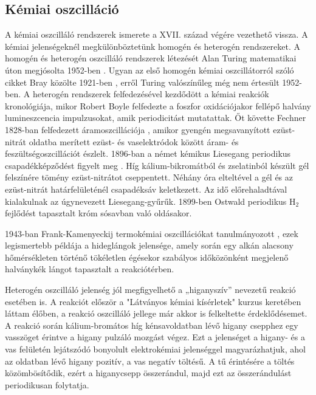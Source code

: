 \subsection{Kémiai oszcilláció}
A kémiai oszcilláló rendszerek ismerete a XVII. század végére vezethető vissza. A kémiai jelenségeknél megkülönböztetünk homogén és heterogén rendszereket. A homogén és heterogén oszcilláló rendszerek létezését Alan Turing matematikai úton megjósolta 1952-ben \cite{turing1952chemical}. Ugyan az első homogén kémiai oszcillátorról szóló cikket Bray közölte 1921-ben \cite{bray1921periodic}, erről Turing valószínűleg még nem értesült 1952-ben. A heterogén rendszerek felfedezésével kezdődött a kémiai reakciók kronológiája, mikor Robert Boyle \cite{harvey1957history} felfedezte a foszfor oxidációjakor fellépő halvány lumineszcencia impulzusokat, amik periodicitást mutatattak. Őt követte Fechner 1828-ban felfedezett áramoszcillációja \cite{fechner1828schweigg}, amikor gyengén megsavanyított ezüst-nitrát oldatba merített ezüst- és vaselektródok között áram- és feszültségoszcillációt észlelt. 1896-ban a német kémikus Liesegang periodikus csapadékképződést figyelt meg \cite{liesegang1896ueber}. Híg kálium-bikromátból és zselatinból készült gél felszínére tömény ezüst-nitrátot cseppentett. Néhány óra elteltével a gél és az ezüst-nitrát határfelületénél csapadéksáv keletkezett. Az idő előrehaladtával kialakulnak az úgynevezett Liesegang-gyűrűk. 1899-ben Ostwald \cite{ostwald1899jacobus} periodikus H$_2$ fejlődést tapasztalt króm sósavban való oldásakor.

1943-ban Frank-Kamenyeckij termokémiai oszcillációkat tanulmányozott \cite{frank1943nikov}, ezek legismertebb példája a hideglángok jelensége, amely során egy alkán alacsony hőmérsékleten történő tökéletlen égésekor szabályos időközönként megjelenő halványkék lángot tapasztalt a reakciótérben.

Heterogén oszcilláló jelenség jól megfigyelhető a „higanyszív” nevezetű reakció esetében is. A reakciót először a "Látványos kémiai kísérletek" kurzus keretében láttam élőben, a reakció oszcilláló jellege már akkor is felkeltette érdeklődésemet. A reakció során kálium-bromátos híg kénsavoldatban lévő higany csepphez egy vasszöget érintve a higany pulzáló mozgást végez. Ezt a jelenséget a higany- és a vas felületén lejátszódó bonyolult elektrokémiai jelenséggel magyarázhatjuk, ahol az oldatban lévő higany pozitív, a vas negatív töltésű. A tű érintésére a töltés közömbösítődik, ezért a higanycsepp összerándul, majd ezt az összerándulást periodikusan folytatja.

